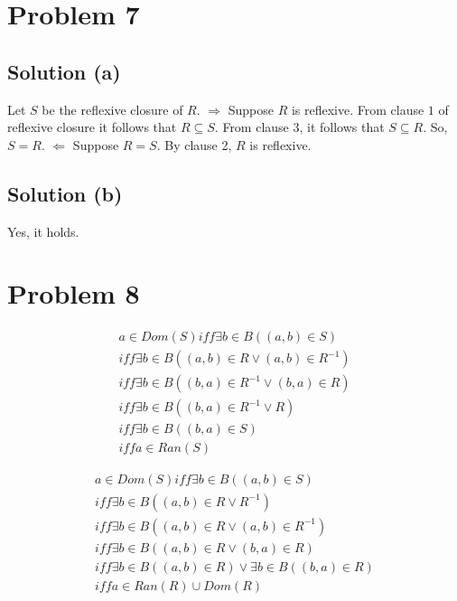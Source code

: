 \documentclass{article}
\begin{document}
\section{Problem 7}
\subsection{Solution (a)}
Let $S$ be the reflexive closure of $R$.
$\Rightarrow$ Suppose $R$ is reflexive. From clause $1$ of reflexive
closure it follows that $R \subseteq S$. From clause 3, it follows
that $S \subseteq R$. So, $S = R$.
$\Leftarrow$ Suppose $R = S$. By clause 2, $R$ is reflexive.

\subsection{Solution (b)}
Yes, it holds.

\section{Problem 8}
\begin{align*}
  a \in Dom(S) iff \exists b \in B((a,b) \in S) \\
  iff \exists b \in B((a,b) \in R \lor (a,b) \in R^{-1}) \\
  iff \exists b \in B((b,a) \in R^{-1} \lor (b,a) \in R) \\
  iff \exists b \in B((b,a) \in R^{-1} \lor R) \\
  iff \exists b \in B((b,a) \in S) \\
  iff a \in Ran(S)
\end{align*}

\begin{align*}
  a \in Dom(S) iff \exists b \in B((a,b) \in S) \\
  iff \exists b \in B((a,b) \in R \lor R^{-1}) \\
  iff \exists b \in B((a,b) \in R \lor (a,b) \in R^{-1}) \\
  iff \exists b \in B((a,b) \in R \lor (b,a) \in R) \\
  iff \exists b \in B((a,b) \in R) \lor \exists b \in B((b,a) \in R) \\
  iff a \in Ran(R) \cup Dom(R)
\end{align*}
\end{document}
